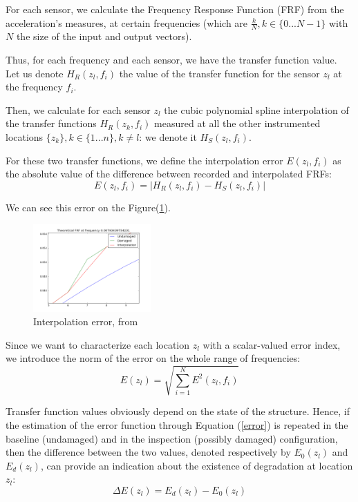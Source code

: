 \documentclass[journal]{IEEEtran}
\begin{document}
For each sensor, we calculate the Frequency Response Function (FRF) from the acceleration's measures, at certain frequencies
(which are $\frac{k}{N}, k \in \{0 ... N-1\}$ with $N$ the size of the input and output vectors).

Thus, for each frequency and each sensor, we have the transfer function value. Let us denote $H_R(z_l,f_i)$ the value of the transfer function for  the sensor $z_l$ at the frequency $f_i$.

Then, we calculate for each sensor $z_l$ the cubic polynomial spline interpolation of the transfer functions $H_R(z_k,f_i)$ measured at all
the other instrumented locations $\{z_k\}, k\in \{1 ... n\}, k \neq l$: we denote it $H_S(z_l,f_i)$.

For these two transfer functions, we define the interpolation error $E(z_l,f_i)$ as the absolute value of the difference between recorded and interpolated FRFs:
\begin{equation}
E(z_l,f_i) = | H_R(z_l,f_i) - H_S(z_l,f_i) |
\end{equation}

We can see this error on the Figure(\ref{interpolation_error}).


\begin{figure}[h!]
  \centering
  \includegraphics[width=0.4\textwidth]{images/interpolation.png}
  \caption{Interpolation error, from \cite{dilena2015damage}}
  \label{interpolation_error}
\end{figure}

Since we want to characterize each location $z_l$ with a scalar-valued error index, we introduce the norm of the error on the whole range of
frequencies:
\begin{equation}
E(z_l) = \sqrt{  \sum\limits_{i=1}^N  E^2(z_l,f_i) }
\label{error}
\end{equation}


Transfer function values obviously depend on the state of the structure. Hence, if the estimation of the error function
through Equation (\ref{error}) is repeated in the baseline (undamaged) and in the inspection (possibly damaged) configuration, then the
difference between the two values, denoted respectively by $E_0(z_l)$ and $E_d(z_l)$, can provide an indication about the existence of
degradation at location $z_l$:
\begin{equation}
\Delta E(z_l) = E_d(z_l) - E_0(z_l)
\end{equation}
\end{document}

